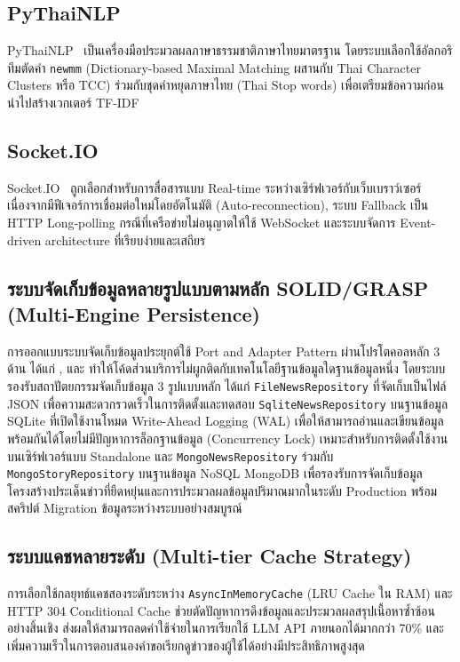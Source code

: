 \subsection{PyThaiNLP}
PyThaiNLP~\parencite{pythainlp2021} เป็นเครื่องมือประมวลผลภาษาธรรมชาติภาษาไทยมาตรฐาน โดยระบบเลือกใช้อัลกอริทึมตัดคำ \texttt{newmm} (Dictionary-based Maximal Matching ผสานกับ Thai Character Clusters หรือ TCC) ร่วมกับชุดคำหยุดภาษาไทย (Thai Stop words) เพื่อเตรียมข้อความก่อนนำไปสร้างเวกเตอร์ TF-IDF

\subsection{Socket.IO}
Socket.IO~\parencite{socketio2024} ถูกเลือกสำหรับการสื่อสารแบบ Real-time ระหว่างเซิร์ฟเวอร์กับเว็บเบราว์เซอร์ เนื่องจากมีฟีเจอร์การเชื่อมต่อใหม่โดยอัตโนมัติ (Auto-reconnection), ระบบ Fallback เป็น HTTP Long-polling กรณีที่เครือข่ายไม่อนุญาตให้ใช้ WebSocket และระบบจัดการ Event-driven architecture ที่เรียบง่ายและเสถียร


\subsection{ระบบจัดเก็บข้อมูลหลายรูปแบบตามหลัก SOLID/GRASP (Multi-Engine Persistence)}
การออกแบบระบบจัดเก็บข้อมูลประยุกต์ใช้ Port and Adapter Pattern ผ่านโปรโตคอลหลัก 3 ด้าน ได้แก่ ,  และ  ทำให้โค้ดส่วนบริการไม่ผูกติดกับเทคโนโลยีฐานข้อมูลใดฐานข้อมูลหนึ่ง โดยระบบรองรับสถาปัตยกรรมจัดเก็บข้อมูล 3 รูปแบบหลัก ได้แก่ \texttt{FileNewsRepository} ที่จัดเก็บเป็นไฟล์ JSON เพื่อความสะดวกรวดเร็วในการติดตั้งและทดสอบ \texttt{SqliteNewsRepository} บนฐานข้อมูล SQLite ที่เปิดใช้งานโหมด Write-Ahead Logging (WAL) \parencite{sqlite_wal} เพื่อให้สามารถอ่านและเขียนข้อมูลพร้อมกันได้โดยไม่มีปัญหาการล็อกฐานข้อมูล (Concurrency Lock) เหมาะสำหรับการติดตั้งใช้งานบนเซิร์ฟเวอร์แบบ Standalone และ \texttt{MongoNewsRepository} ร่วมกับ \texttt{MongoStoryRepository} บนฐานข้อมูล NoSQL MongoDB เพื่อรองรับการจัดเก็บข้อมูลโครงสร้างประเด็นข่าวที่ยืดหยุ่นและการประมวลผลข้อมูลปริมาณมากในระดับ Production พร้อมสคริปต์ Migration ข้อมูลระหว่างระบบอย่างสมบูรณ์


\subsection{ระบบแคชหลายระดับ (Multi-tier Cache Strategy)}
การเลือกใช้กลยุทธ์แคชสองระดับระหว่าง \texttt{AsyncInMemoryCache} (LRU Cache ใน RAM) และ HTTP 304 Conditional Cache ช่วยตัดปัญหาการดึงข้อมูลและประมวลผลสรุปเนื้อหาซ้ำซ้อนอย่างสิ้นเชิง ส่งผลให้สามารถลดค่าใช้จ่ายในการเรียกใช้ LLM API ภายนอกได้มากกว่า 70\% และเพิ่มความเร็วในการตอบสนองคำขอเรียกดูข่าวของผู้ใช้ได้อย่างมีประสิทธิภาพสูงสุด
